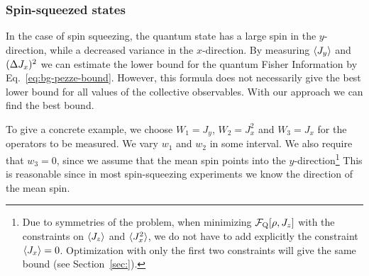 \subsubsection{Spin-squeezed states}
\label{sec:lt-bound-spsq}

In the case of spin squeezing, the quantum state has a large spin in the $y$-direction, while a decreased variance in the $x$-direction.
By measuring $\langle{J_y}\rangle$ and $(\Delta J_x )^2$ we can estimate the lower bound for the quantum Fisher Information by Eq.~\eqref{eq:bg-pezze-bound}.
However, this formula does not necessarily give the best lower bound for all values of the collective observables.
With our approach we can find the best bound.

To give a concrete example, we choose $W_1=J_y$, $W_2=J_x^2$ and $W_3=J_x$ for the operators to be measured.
We vary $w_1$ and $w_2$ in some interval.
We also require that $w_3=0$, since we assume that the mean spin points into the $y$-direction\footnote{
Due to symmetries of the problem, when minimizing $\mathcal{F}_{\textnormal{Q}}[{\textstyle \rho,J_z}]$ with the constraints on $\langle{J_z}\rangle$ and $\langle{J_x^2}\rangle$, we do not have to add explicitly the constraint $\langle{J_x}\rangle=0$.
Optimization with only the first two constraints will give the same bound (see Section~\ref{sec:}).}
This is reasonable since in most spin-squeezing experiments we know the direction of the mean spin.

